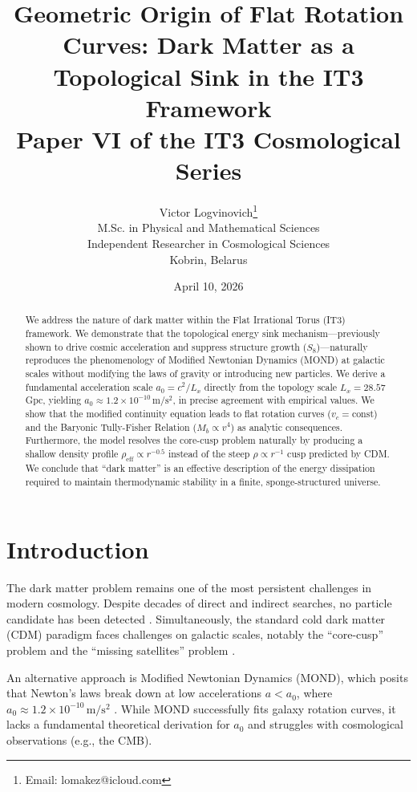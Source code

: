 \documentclass[12pt,a4paper]{article}
\title{\textbf{Geometric Origin of Flat Rotation Curves: Dark Matter as a Topological Sink in the IT3 Framework}\\[0.5cm]
\large Paper VI of the IT3 Cosmological Series}
\author{Victor Logvinovich\thanks{Email: lomakez@icloud.com}\\
M.Sc. in Physical and Mathematical Sciences\\
Independent Researcher in Cosmological Sciences\\
Kobrin, Belarus}
\date{April 10, 2026}
\begin{document}
\maketitle

\begin{abstract}
We address the nature of dark matter within the Flat Irrational Torus (IT3) framework. We demonstrate that the topological energy sink mechanism---previously shown to drive cosmic acceleration and suppress structure growth ($S_8$)---naturally reproduces the phenomenology of Modified Newtonian Dynamics (MOND) at galactic scales without modifying the laws of gravity or introducing new particles. We derive a fundamental acceleration scale $a_0 = c^2/L_x$ directly from the topology scale $L_x = 28.57$\,Gpc, yielding $a_0 \approx 1.2 \times 10^{-10}\,\mathrm{m/s^2}$, in precise agreement with empirical values. We show that the modified continuity equation leads to flat rotation curves ($v_c = \text{const}$) and the Baryonic Tully-Fisher Relation ($M_b \propto v^4$) as analytic consequences. Furthermore, the model resolves the core-cusp problem naturally by producing a shallow density profile $\rho_{\mathrm{eff}} \propto r^{-0.5}$ instead of the steep $\rho \propto r^{-1}$ cusp predicted by CDM. We conclude that ``dark matter'' is an effective description of the energy dissipation required to maintain thermodynamic stability in a finite, sponge-structured universe.
\end{abstract}

\section{Introduction}

The dark matter problem remains one of the most persistent challenges in modern cosmology. Despite decades of direct and indirect searches, no particle candidate has been detected \citep{Bertone2018}. Simultaneously, the standard cold dark matter (CDM) paradigm faces challenges on galactic scales, notably the ``core-cusp'' problem and the ``missing satellites'' problem \citep{Bullock2017}.

An alternative approach is Modified Newtonian Dynamics (MOND), which posits that Newton's laws break down at low accelerations $a < a_0$, where $a_0 \approx 1.2 \times 10^{-10}\,\mathrm{m/s^2}$ \citep{Milgrom1983}. While MOND successfully fits galaxy rotation curves, it lacks a fundamental theoretical derivation for $a_0$ and struggles with cosmological observations (e.g., the CMB).
\end{document}
